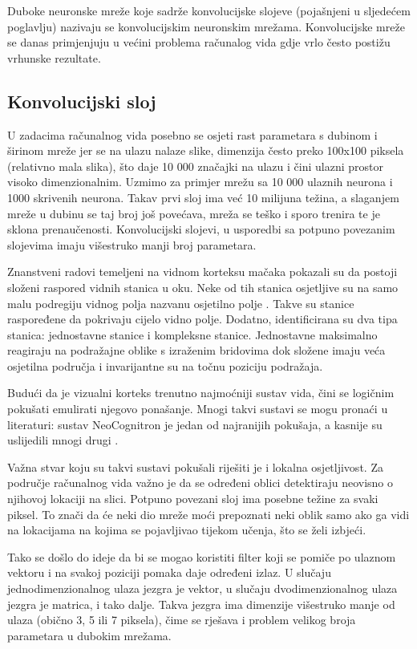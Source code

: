 \documentclass[times, utf8, diplomski, numeric]{fer}
\begin{document}
Duboke neuronske mreže koje sadrže konvolucijske slojeve (pojašnjeni u sljedećem poglavlju) nazivaju se konvolucijskim neuronskim mrežama. Konvolucijske mreže se danas primjenjuju u većini problema računalog vida gdje vrlo često postižu vrhunske rezultate.

\subsection{Konvolucijski sloj}

U zadacima računalnog vida posebno se osjeti rast parametara s dubinom i širinom mreže jer se na ulazu nalaze slike, dimenzija često preko 100x100 piksela (relativno mala slika), što daje 10 000 značajki na ulazu i čini ulazni prostor visoko dimenzionalnim. Uzmimo za primjer mrežu sa 10 000 ulaznih neurona i 1000 skrivenih neurona. Takav prvi sloj ima već 10 milijuna težina, a slaganjem mreže u dubinu se taj broj još povećava, mreža se teško i sporo trenira te je sklona prenaučenosti. Konvolucijski slojevi, u usporedbi sa potpuno povezanim slojevima imaju višestruko manji broj parametara.

Znanstveni radovi temeljeni na vidnom korteksu  mačaka pokazali su da postoji složeni raspored vidnih stanica u oku. Neke od tih stanica osjetljive su na samo malu podregiju vidnog polja nazvanu osjetilno polje . Takve su stanice raspoređene da pokrivaju cijelo vidno polje. Dodatno, identificirana su dva tipa stanica: jednostavne stanice i kompleksne stanice. Jednostavne maksimalno reagiraju na podražajne oblike s izraženim bridovima dok složene imaju veća osjetilna područja i invarijantne su na točnu poziciju podražaja.

Budući da je vizualni korteks trenutno najmoćniji sustav vida, čini se logičnim pokušati emulirati njegovo ponašanje. Mnogi takvi sustavi se mogu pronaći u literaturi: sustav NeoCognitron \cite{neocognitron} je jedan od najranijih pokušaja, a kasnije su uslijedili mnogi drugi \cite{cortex_mehachanism} \cite{gradient_document}.

Važna stvar koju su takvi sustavi pokušali riješiti je i lokalna osjetljivost.
Za područje računalnog vida važno je da se određeni oblici detektiraju neovisno o njihovoj lokaciji na slici. Potpuno povezani sloj ima posebne težine za svaki piksel. To znači da će neki dio mreže moći prepoznati neki oblik samo ako ga vidi na lokacijama na kojima se pojavljivao tijekom učenja, što se želi izbjeći.

Tako se došlo do ideje da bi se mogao koristiti filter koji se pomiče po ulaznom vektoru i na svakoj poziciji pomaka daje određeni izlaz. U slučaju jednodimenzionalnog ulaza jezgra je vektor, u slučaju dvodimenzionalnog ulaza jezgra je matrica, i tako dalje. Takva jezgra ima dimenzije višestruko manje od ulaza (obično 3, 5 ili 7 piksela), čime se rješava i problem velikog broja parametara u dubokim mrežama.
\end{document}

